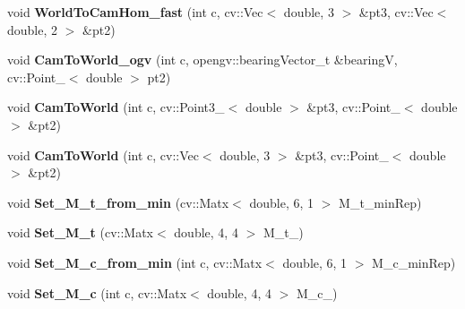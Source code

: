 \begin{DoxyCompactItemize}
\item 
void {\bfseries World\+To\+Cam\+Hom\+\_\+fast} (int c, cv\+::\+Vec$<$ double, 3 $>$ \&pt3, cv\+::\+Vec$<$ double, 2 $>$ \&pt2)\hypertarget{classMultiColSLAM_1_1cMultiCamSys___a32ccb45fcc1754abf27858be133b25ed}{}\label{classMultiColSLAM_1_1cMultiCamSys___a32ccb45fcc1754abf27858be133b25ed}

\item 
void {\bfseries Cam\+To\+World\+\_\+ogv} (int c, opengv\+::bearing\+Vector\+\_\+t \&bearingV, cv\+::\+Point\+\_\+$<$ double $>$ pt2)\hypertarget{classMultiColSLAM_1_1cMultiCamSys___aad5f0cfbbd2017e49b49b0a49d5acda6}{}\label{classMultiColSLAM_1_1cMultiCamSys___aad5f0cfbbd2017e49b49b0a49d5acda6}

\item 
void {\bfseries Cam\+To\+World} (int c, cv\+::\+Point3\+\_\+$<$ double $>$ \&pt3, cv\+::\+Point\+\_\+$<$ double $>$ \&pt2)\hypertarget{classMultiColSLAM_1_1cMultiCamSys___a6d1acde556e1a3e1a439103ccffa7431}{}\label{classMultiColSLAM_1_1cMultiCamSys___a6d1acde556e1a3e1a439103ccffa7431}

\item 
void {\bfseries Cam\+To\+World} (int c, cv\+::\+Vec$<$ double, 3 $>$ \&pt3, cv\+::\+Point\+\_\+$<$ double $>$ \&pt2)\hypertarget{classMultiColSLAM_1_1cMultiCamSys___af1406b95527481a1527016e6ae7b31aa}{}\label{classMultiColSLAM_1_1cMultiCamSys___af1406b95527481a1527016e6ae7b31aa}

\item 
void {\bfseries Set\+\_\+\+M\+\_\+t\+\_\+from\+\_\+min} (cv\+::\+Matx$<$ double, 6, 1 $>$ M\+\_\+t\+\_\+min\+Rep)\hypertarget{classMultiColSLAM_1_1cMultiCamSys___a8778a4538527a291be32dbb542d31a10}{}\label{classMultiColSLAM_1_1cMultiCamSys___a8778a4538527a291be32dbb542d31a10}

\item 
void {\bfseries Set\+\_\+\+M\+\_\+t} (cv\+::\+Matx$<$ double, 4, 4 $>$ M\+\_\+t\+\_\+)\hypertarget{classMultiColSLAM_1_1cMultiCamSys___a5f55a4c3d92dda52ecaf3517df5daa12}{}\label{classMultiColSLAM_1_1cMultiCamSys___a5f55a4c3d92dda52ecaf3517df5daa12}

\item 
void {\bfseries Set\+\_\+\+M\+\_\+c\+\_\+from\+\_\+min} (int c, cv\+::\+Matx$<$ double, 6, 1 $>$ M\+\_\+c\+\_\+min\+Rep)\hypertarget{classMultiColSLAM_1_1cMultiCamSys___a989b4a52f4e372d2620ced94fc675b02}{}\label{classMultiColSLAM_1_1cMultiCamSys___a989b4a52f4e372d2620ced94fc675b02}

\item 
void {\bfseries Set\+\_\+\+M\+\_\+c} (int c, cv\+::\+Matx$<$ double, 4, 4 $>$ M\+\_\+c\+\_\+)\hypertarget{classMultiColSLAM_1_1cMultiCamSys___a39483546d528acc5acdbe500cbf9d23c}{}\label{classMultiColSLAM_1_1cMultiCamSys___a39483546d528acc5acdbe500cbf9d23c}


\end{DoxyCompactItemize}
